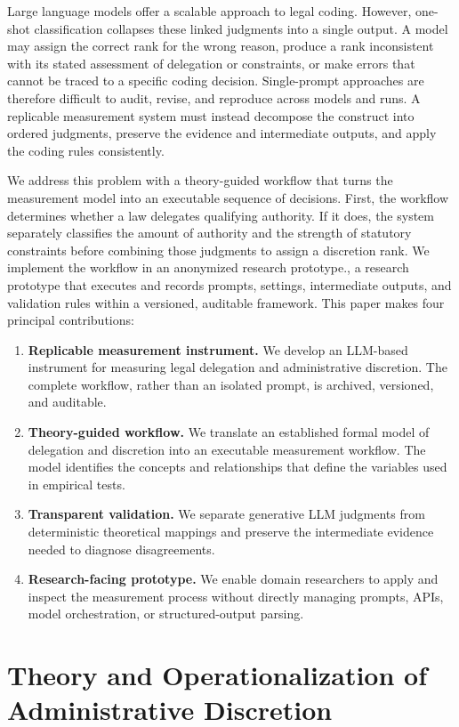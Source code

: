 \documentclass[conference]{IEEEtran}
\newcommand{\systemname}{an anonymized research prototype.}
\begin{document}
Large language models offer a scalable approach to legal coding. However, one-shot classification collapses these linked judgments into a single output. A model may assign the correct rank for the wrong reason, produce a rank inconsistent with its stated assessment of delegation or constraints, or make errors that cannot be traced to a specific coding decision. Single-prompt approaches are therefore difficult to audit, revise, and reproduce across models and runs. A replicable measurement system must instead decompose the construct into ordered judgments, preserve the evidence and intermediate outputs, and apply the coding rules consistently.

We address this problem with a theory-guided workflow that turns the measurement model into an executable sequence of decisions. First, the workflow determines whether a law delegates qualifying authority. If it does, the system separately classifies the amount of authority and the strength of statutory constraints before combining those judgments to assign a discretion rank. We implement the workflow in \systemname{}, a research prototype that executes and records prompts, settings, intermediate outputs, and validation rules within a versioned, auditable framework. This paper makes four principal contributions:
\begin{enumerate}[nosep]
    \item \textbf{Replicable measurement instrument.} We develop an LLM-based instrument for measuring legal delegation and administrative discretion. The complete workflow, rather than an isolated prompt, is archived, versioned, and auditable.
    \item \textbf{Theory-guided workflow.} We translate an established formal model of delegation and discretion into an executable measurement workflow. The model identifies the concepts and relationships that define the variables used in empirical tests.
    \item \textbf{Transparent validation.} We separate generative LLM judgments from deterministic theoretical mappings and preserve the intermediate evidence needed to diagnose disagreements.
    \item \textbf{Research-facing prototype.} We enable domain researchers to apply and inspect the measurement process without directly managing prompts, APIs, model orchestration, or structured-output parsing.
\end{enumerate}


\section{Theory and Operationalization of Administrative Discretion}
\end{document}
